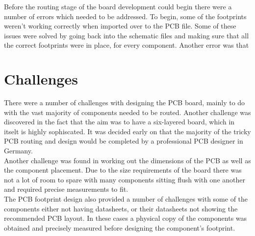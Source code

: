 	Before the routing stage of the board development could begin there were a number of errors which needed to be addressed. To begin, some of the footprints weren't working correctly when imported over to the PCB file. Some of these issues were solved by going back into the schematic files and making sure that all the correct footprints were in place, for every component. Another error was that 

\section{Challenges}

	There were a number of challenges with designing the PCB board, mainly to do with the vast majority of components needed to be routed. Another challenge was discovered in the fact that the aim was to have a six-layered board, which in itselt is highly sophiscated. It was decided early on that the majority of the tricky PCB routing and design would be completed by a professional PCB designer in Germany.\\
Another challenge was found in working out the dimensions of the PCB as well as the component placement. Due to the size requirements of the board there was not a lot of room to spare with many components sitting flush with one another and required precise measurements to fit. \\
The PCB footprint design also provided a number of challenges with some of the components either not having datasheets, or their datasheets not showing the recommended PCB layout. In these cases a physical copy of the components was obtained and precisely measured before designing the component's footprint.











